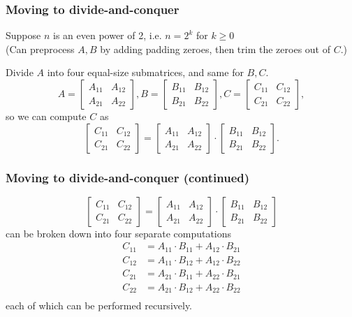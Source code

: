 \documentclass{beamer}
\begin{document}
\begin{frame} \frametitle{Moving to divide-and-conquer}
  Suppose $n$ is an even power of 2, i.e. $n=2^k$ for $k \geq 0$ \\
  (Can preprocess $A, B$ by adding padding zeroes, then trim the zeroes
   out of $C.$)

  Divide $A$ into four equal-size submatrices, and same for $B, C$.
  \[ A = \begin{bmatrix} A_{11} & A_{12} \\ A_{21} & A_{22} \end{bmatrix},
     B = \begin{bmatrix} B_{11} & B_{12} \\ B_{21} & B_{22} \end{bmatrix},
     C = \begin{bmatrix} C_{11} & C_{12} \\ C_{21} & C_{22} \end{bmatrix},
   \]
  so we can compute $C$ as
  \[ \begin{bmatrix} C_{11} & C_{12} \\ C_{21} & C_{22} \end{bmatrix}
     =
     \begin{bmatrix} A_{11} & A_{12} \\ A_{21} & A_{22} \end{bmatrix}
     \cdot
     \begin{bmatrix} B_{11} & B_{12} \\ B_{21} & B_{22} \end{bmatrix} . \]
\end{frame}

\begin{frame} \frametitle{Moving to divide-and-conquer (continued)}
\[ \begin{bmatrix} C_{11} & C_{12} \\ C_{21} & C_{22} \end{bmatrix}
   =
   \begin{bmatrix} A_{11} & A_{12} \\ A_{21} & A_{22} \end{bmatrix}
   \cdot
   \begin{bmatrix} B_{11} & B_{12} \\ B_{21} & B_{22} \end{bmatrix} \]
can be broken down into four separate computations
\begin{align*}
  C_{11} &= A_{11} \cdot B_{11} + A_{12} \cdot B_{21} \\
  C_{12} &= A_{11} \cdot B_{12} + A_{12} \cdot B_{22} \\
  C_{21} &= A_{21} \cdot B_{11} + A_{22} \cdot B_{21} \\
  C_{22} &= A_{21} \cdot B_{12} + A_{22} \cdot B_{22} \\
\end{align*}
each of which can be performed recursively.
\end{frame}
\end{document}
